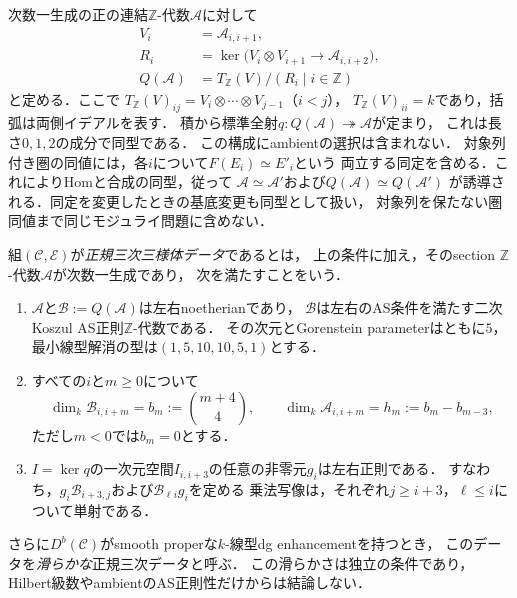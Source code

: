 次数一生成の正の連結$\mathbb Z$-代数$\mathcal A$に対して
\begin{align}
 V_i&=\mathcal A_{i,i+1},\\
 R_i&=\ker\bigl(V_i\otimes V_{i+1}\longrightarrow\mathcal A_{i,i+2}\bigr),
 \label{eq:intrinsic-quadratic-relations}\\
 Q(\mathcal A)&=T_{\mathbb Z}(V)/(R_i\mid i\in\mathbb Z)
 \label{eq:intrinsic-quadratic-envelope}
\end{align}
と定める．ここで
$T_{\mathbb Z}(V)_{ij}=V_i\otimes\cdots\otimes V_{j-1}$（$i<j$），
$T_{\mathbb Z}(V)_{ii}=k$であり，括弧は両側イデアルを表す．
積から標準全射$q:Q(\mathcal A)\twoheadrightarrow\mathcal A$が定まり，
これは長さ$0,1,2$の成分で同型である．
この構成にambientの選択は含まれない．
対象列付き圏の同値には，各$i$について$F(E_i)\simeq E'_i$という
両立する同定を含める．これによりHomと合成の同型，従って
$\mathcal A\simeq\mathcal A'$および$Q(\mathcal A)\simeq Q(\mathcal A')$
が誘導される．同定を変更したときの基底変更も同型として扱い，
対象列を保たない圏同値まで同じモジュライ問題に含めない．

\begin{definition}[豊富列付きの正規三次データ]
\label{def:intrinsic-cubic-datum}
組$(\mathcal C,\mathcal E)$が\emph{正規三次三様体データ}であるとは，
上の条件に加え，そのsection $\mathbb Z$-代数$\mathcal A$が次数一生成であり，
次を満たすことをいう．
\begin{enumerate}[label=\textup{(\roman*)}]
\item $\mathcal A$と$\mathcal B:=Q(\mathcal A)$は左右noetherianであり，
$\mathcal B$は左右のAS条件を満たす二次Koszul AS正則$\mathbb Z$-代数である．
その次元とGorenstein parameterはともに$5$，
最小線型解消の型は$(1,5,10,10,5,1)$とする．
\item すべての$i$と$m\geq0$について
\begin{equation}\label{eq:intrinsic-cubic-hilbert}
 \dim_k\mathcal B_{i,i+m}=b_m:=\binom{m+4}{4},\qquad
 \dim_k\mathcal A_{i,i+m}=h_m:=b_m-b_{m-3},
\end{equation}
ただし$m<0$では$b_m=0$とする．
\item $I=\ker q$の一次元空間$I_{i,i+3}$の任意の非零元$g_i$は左右正則である．
すなわち，$g_i\mathcal B_{i+3,j}$および$\mathcal B_{\ell i}g_i$を定める
乗法写像は，それぞれ$j\geq i+3$，$\ell\leq i$について単射である．
\end{enumerate}
さらに$D^b(\mathcal C)$がsmooth properな$k$-線型dg enhancementを持つとき，
このデータを\emph{滑らかな}正規三次データと呼ぶ．
この滑らかさは独立の条件であり，Hilbert級数やambientのAS正則性だけからは結論しない．
\end{definition}

